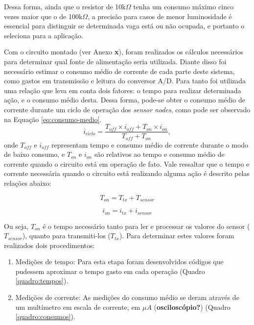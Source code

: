 \documentclass[oneside,openright,12pt]{ufsm_2015} %
\begin{document}
    Dessa forma, ainda que o resistor de 10k$\Omega$ tenha um consumo máximo cinco vezes maior que o de 100k$\Omega$, a precisão para casos de menor luminosidade é essencial para distinguir se determinada vaga está ou não ocupada, e portanto o seleciona para a aplicação.
    
    Com o circuito montado (ver Anexo \textbf{x}), foram realizados os cálculos necessários para determinar qual fonte de alimentação seria utilizada. Diante disso foi necessário estimar o consumo médio de corrente de cada parte deste sistema, como gastos em transmissão e leitura do conversor A/D. Para tanto
    foi utilizada uma relação que leva em conta dois fatores: o tempo para realizar determinada ação, e o consumo médio desta. Dessa forma, pode-se obter o consumo médio de corrente durante um ciclo de operação dos \textit{sensor nodes}, como pode ser observado na Equação \ref{eq:consumo-medio}.
    \begin{equation}\label{eq:consumo-medio}
        \overline{i}_{ciclo} = \frac{T_{off}\times i_{off} + T_{on}\times i_{on}}{T_{off}+T_{on}},
    \end{equation}
    onde $T_{off}$ e $i_{off}$ representam tempo e consumo médio de corrente durante o modo de baixo consumo, e $T_{on}$ e $i_{on}$ são relativos ao tempo e consumo médio de corrente quando o circuito está em operação de fato. Vale ressaltar que o tempo e corrente necessária quando o circuito está realizando alguma ação é descrito pelas relações abaixo:
    
    \begin{equation}
        T_{on} = T_{tx} + T_{sensor}
    \end{equation}
    
    \begin{equation}
        i_{on} = i_{tx} + i_{sensor}
    \end{equation}
    
    Ou seja, $T_{on}$ é o tempo necessário tanto para ler e processar os valores do sensor ($T_{sensor}$), quanto para transmiti-los ($T_{tx}$). Para determinar estes valores foram realizados dois procedimentos:
    
    \begin{enumerate}
        \item Medições de tempo: Para esta etapa foram desenvolvidos códigos que pudessem aproximar o tempo gasto em cada operação (Quadro \ref{quadro:tempos}). 
        
        \item Medições de corrente: As medições do consumo médio se deram através de um multímetro em escala de corrente, em $\mu A$ (\textbf{osciloscópio?}) (Quadro \ref{quadro:consumos}).
    \end{enumerate}
    
\end{document}
